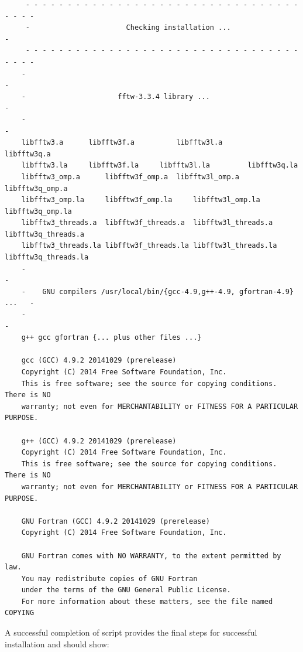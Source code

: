 \documentclass[a4paper,11pt]{article}
\begin{document}
\begin{verbatim}
     - - - - - - - - - - - - - - - - - - - - - - - - - - - - - - - - - - - - -
     -                       Checking installation ...                       -
     - - - - - - - - - - - - - - - - - - - - - - - - - - - - - - - - - - - - -
    -                                                                       -
    -                      fftw-3.3.4 library ...                           -
    -                                                                        -
    libfftw3.a	    libfftw3f.a	         libfftw3l.a	      libfftw3q.a
    libfftw3.la	    libfftw3f.la	 libfftw3l.la	      libfftw3q.la
    libfftw3_omp.a	    libfftw3f_omp.a	 libfftw3l_omp.a      libfftw3q_omp.a
    libfftw3_omp.la	    libfftw3f_omp.la     libfftw3l_omp.la     libfftw3q_omp.la
    libfftw3_threads.a  libfftw3f_threads.a  libfftw3l_threads.a  libfftw3q_threads.a
    libfftw3_threads.la libfftw3f_threads.la libfftw3l_threads.la libfftw3q_threads.la
    -                                                                       -
    -    GNU compilers /usr/local/bin/{gcc-4.9,g++-4.9, gfortran-4.9} ...   -
    -                                                                       -
    g++	gcc	gfortran {... plus other files ...}

    gcc (GCC) 4.9.2 20141029 (prerelease)
    Copyright (C) 2014 Free Software Foundation, Inc.
    This is free software; see the source for copying conditions.  There is NO
    warranty; not even for MERCHANTABILITY or FITNESS FOR A PARTICULAR PURPOSE.

    g++ (GCC) 4.9.2 20141029 (prerelease)
    Copyright (C) 2014 Free Software Foundation, Inc.
    This is free software; see the source for copying conditions.  There is NO  
    warranty; not even for MERCHANTABILITY or FITNESS FOR A PARTICULAR PURPOSE.

    GNU Fortran (GCC) 4.9.2 20141029 (prerelease)
    Copyright (C) 2014 Free Software Foundation, Inc.

    GNU Fortran comes with NO WARRANTY, to the extent permitted by law.
    You may redistribute copies of GNU Fortran
    under the terms of the GNU General Public License.
    For more information about these matters, see the file named COPYING
\end{verbatim}
A successful completion of script provides the final steps for
successful installation and should show:
\end{document}
